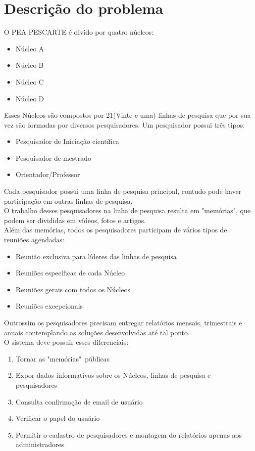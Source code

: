\documentclass[11pt]{../../classes/ifscarticle}
\begin{document}
\section{Descrição do problema}

O PEA PESCARTE é divido por quatro núcleos:
\begin{itemize}
    \item Núcleo A
    \item Núcleo B
    \item Núcleo C
    \item Núcleo D
\end{itemize}
Esses Núcleos são compostos por 21(Vinte e uma) linhas
de pesquisa que por sua vez são formadas por
diversos pesquisadores. Um pesquisador possui três tipos:
\begin{itemize}
    \item Pesquisador de Iniciação científica
    \item Pesquisador de mestrado
    \item Orientador/Professor
\end{itemize}
Cada pesquisador possui uma linha de pesquisa principal,
contudo pode haver participação em outras linhas de pesquisa.\\
O trabalho desses pesquisadores na linha de pesquisa resulta
em "memórias", que podem ser divididas em vídeos, fotos e artigos.\\
Além das memórias, todos os pesquisadores participam de vários tipos
de reuniões agendadas:
\begin{itemize}
    \item Reunião exclusiva para líderes das linhas de pesquisa
    \item Reuniões específicas de cada Núcleo
    \item Reuniões gerais com todos os Núcleos
    \item Reuniões excepcionais
\end{itemize}
Outrossim os pesquisadores precisam entregar relatórios mensais,
trimestrais e anuais contemplando as soluções desenvolvidas até tal ponto.\\
\clearpage
O sistema deve possuir esses diferenciais:

\begin{enumerate}
    \item Tornar as "memórias"\ públicas
    \item Expor dados informativos sobre os Núcleos, linhas de pesquisa e pesquisadores
    \item Consulta confirmação de email de usuário
    \item Verificar o papel do usuário
    \item Permitir o cadastro de pesquisadores e montagem do relatórios apenas aos administradores
\end{enumerate}
\end{document}
